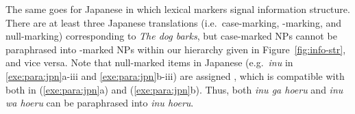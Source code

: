 


\noindent The same goes for Japanese in which lexical markers signal
information structure. There are at least three
Japanese translations (i.e.\ case-marking, \wa-marking, and
null-marking) corresponding to \textit{The dog barks}, but case-marked
NPs cannot be paraphrased into \wa-marked NPs within our
 hierarchy given in
Figure~\ref{fig:info-str}, and vice versa. Note
that null-marked items in Japanese (e.g.\ \textit{inu} in
\ref{exe:para:jpn}a-iii and \ref{exe:para:jpn}b-iii) are assigned
 \citep{yatabe:99}, which is compatible with both
 in (\ref{exe:para:jpn}a) and 
(\ref{exe:para:jpn}b). Thus, both \textit{inu ga hoeru} and
\textit{inu wa hoeru} can be paraphrased into \textit{inu hoeru}.





